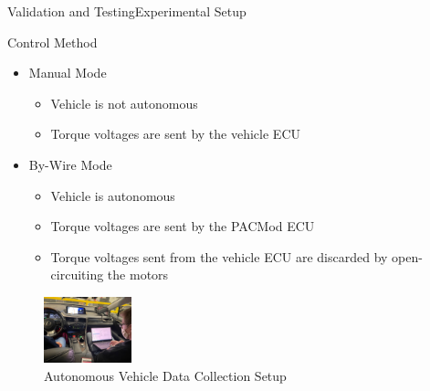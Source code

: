 \documentclass{beamer}
\begin{document}
\begin{frame}{Validation and Testing}{Experimental Setup}
	\begin{block}{Control Method}
		\begin{itemize}
			\item Manual Mode
			\begin{itemize}
				\item Vehicle is not autonomous
				\item Torque voltages are sent by the vehicle ECU
			\end{itemize}
			\item By-Wire Mode
			\begin{itemize}
				\item Vehicle is autonomous
				\item Torque voltages are sent by the PACMod ECU
				\item Torque voltages sent from the vehicle ECU are discarded by open-circuiting the motors
			\end{itemize}
		\end{itemize}
		\begin{figure}
			\centering
    			\captionsetup{justification=centering, margin=3cm}
    			\includegraphics[width=1in]{figs/img/picturesVisitToAStuff/dataColletionSetup1-20211007}
    			\caption{Autonomous Vehicle Data Collection Setup}
    			\label{fig:vehicleSetup}
		\end{figure}
	\end{block}
\end{frame}
\end{document}
